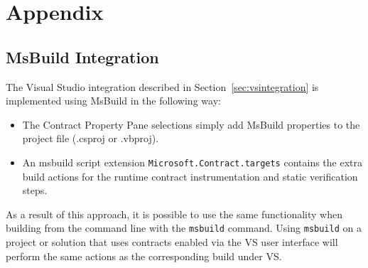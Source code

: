 \documentclass{article}
\newcommand{\code}[1]{\lstinline{#1}}
\begin{document}
\appendix

\section{Appendix}


\subsection{MsBuild Integration}
\label{sec:msbuild}
The Visual Studio integration described in Section~\ref{sec:vsintegration} is implemented using MsBuild in the following way: 
\begin{itemize}
\item The Contract Property Pane selections simply add MsBuild properties to the project file (.csproj or .vbproj).
\item An msbuild script extension
\code{Microsoft.Contract.targets} contains the extra build actions
for the runtime contract instrumentation and static verification
steps.
\end{itemize}
As a result of this approach, it is possible to use the same
functionality when building from the command line with the
\code{msbuild} command. Using \code{msbuild} on a project or solution
that uses contracts enabled via the VS user interface will perform the
same actions as the corresponding build under VS.
\end{document}
